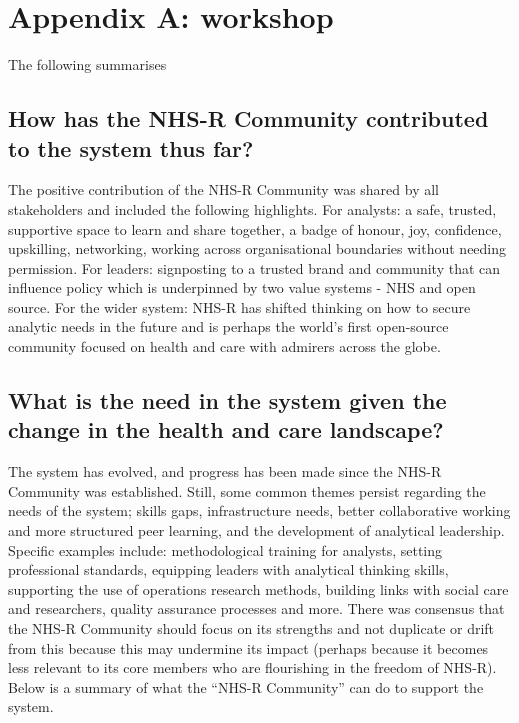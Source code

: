 \documentclass[
]{book}
\begin{document}
\hypertarget{appendix-a-workshop}{%
\section{Appendix A: workshop}\label{appendix-a-workshop}}

The following summarises

\hypertarget{how-has-the-nhs-r-community-contributed-to-the-system-thus-far}{%
\subsection{How has the NHS-R Community contributed to the system thus far?}\label{how-has-the-nhs-r-community-contributed-to-the-system-thus-far}}

The positive contribution of the NHS-R Community was shared by all stakeholders and included the following highlights. For analysts: a safe, trusted, supportive space to learn and share together, a badge of honour, joy, confidence, upskilling, networking, working across organisational boundaries without needing permission. For leaders: signposting to a trusted brand and community that can influence policy which is underpinned by two value systems - NHS and open source. For the wider system: NHS-R has shifted thinking on how to secure analytic needs in the future and is perhaps the world's first open-source community focused on health and care with admirers across the globe.

\hypertarget{what-is-the-need-in-the-system-given-the-change-in-the-health-and-care-landscape}{%
\subsection{What is the need in the system given the change in the health and care landscape?}\label{what-is-the-need-in-the-system-given-the-change-in-the-health-and-care-landscape}}

The system has evolved, and progress has been made since the NHS-R Community was established. Still, some common themes persist regarding the needs of the system; skills gaps, infrastructure needs, better collaborative working and more structured peer learning, and the development of analytical leadership. Specific examples include: methodological training for analysts, setting professional standards, equipping leaders with analytical thinking skills, supporting the use of operations research methods, building links with social care and researchers, quality assurance processes and more. There was consensus that the NHS-R Community should focus on its strengths and not duplicate or drift from this because this may undermine its impact (perhaps because it becomes less relevant to its core members who are flourishing in the freedom of NHS-R). Below is a summary of what the ``NHS-R Community'' can do to support the system.
\end{document}
